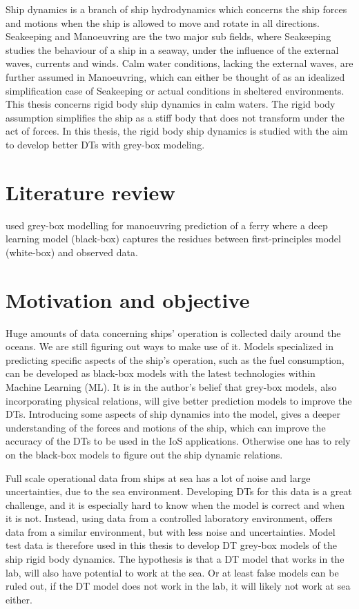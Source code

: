Ship dynamics is a branch of ship hydrodynamics which concerns the ship forces and motions when the ship is allowed to move and rotate in all directions. Seakeeping and Manoeuvring are the two major sub fields, where Seakeeping studies the  behaviour of a ship in a seaway, under the influence of the external waves, currents and winds. Calm water conditions, lacking the external waves, are further assumed in Manoeuvring, which can either be thought of as an idealized simplification case of Seakeeping or actual conditions in sheltered environments. This thesis concerns rigid body ship dynamics in calm waters. The rigid body assumption simplifies the ship as a stiff body that does not transform under the act of forces. In this thesis, the rigid body ship dynamics is studied with the aim to develop better DTs with grey-box modeling.

\section{Literature review}
\cite{nielsen_machine_2022} used grey-box modelling for manoeuvring prediction of a ferry where a deep learning model (black-box) captures the residues between first-principles model (white-box) and observed data.

\section{Motivation and objective}
\label{sec:motivation}
Huge amounts of data concerning ships' operation is collected daily around the oceans. We are still figuring out ways to make use of it. Models specialized in predicting specific aspects of the ship's operation, such as the fuel consumption, can be developed as black-box models with the latest technologies within Machine Learning (ML). It is in the author's belief that grey-box models, also incorporating physical relations, will give better prediction models to improve the DTs. Introducing some aspects of ship dynamics into the model, gives a deeper understanding of the forces and motions of the ship, which can improve the accuracy of the DTs to be used in the IoS applications. Otherwise one has to rely on the black-box models to figure out the ship dynamic relations. 

Full scale operational data from ships at sea has a lot of noise and large uncertainties, due to the sea environment. Developing DTs for this data is a great challenge, and it is especially hard to know when the model is correct and when it is not. Instead, using data from a controlled laboratory environment, offers data from a similar environment, but with less noise and uncertainties. 
Model test data is therefore used in this thesis to develop DT grey-box models of the ship rigid body dynamics. The hypothesis is that a DT model that works in the lab, will also have potential to work at the sea. Or at least false models can be ruled out, if the DT model does not work in the lab, it will likely not work at sea either. 

